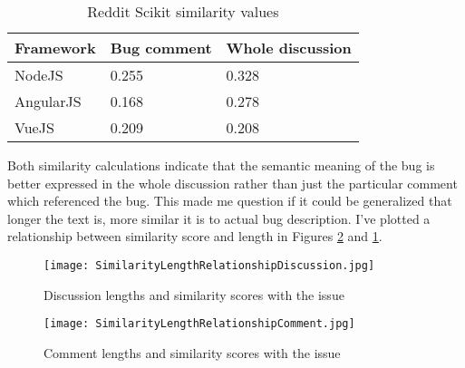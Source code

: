 \begin{table}[H]
\centering
\begin{tabular}{ |p{3cm}||p{3cm}|p{4cm}|}
 \hline
\textbf{ Framework }& \textbf{Bug comment}& \textbf{Whole discussion}\\
 \hline
 NodeJS   & 0.255 & 0.328\\ \hline 
 AngularJS & 0.168 & 0.278 \\ \hline 
 VueJS &  0.209  & 0.208\\ \hline
\end{tabular}
\caption{Reddit Scikit similarity values}
\label{table:RedditSCIKITsimilarity}
\end{table}

Both similarity calculations indicate that the semantic meaning of the bug is better expressed in the whole discussion rather than just the particular comment which referenced the bug. This made me question if it could be generalized that longer the text is, more similar it is to actual bug description. I've plotted a relationship between similarity score and length in Figures \ref{fig:SimilarityLengthRelationshipComment} and \ref{fig:SimilarityLengthRelationshipDiscussion}.

\begin{figure}[H]%
    \centering
	\texttt{[image: SimilarityLengthRelationshipDiscussion.jpg]}
    \caption{Discussion lengths and similarity scores with the issue}%
    \label{fig:SimilarityLengthRelationshipDiscussion}%
\end{figure}

\begin{figure}[H]%
    \centering
	\texttt{[image: SimilarityLengthRelationshipComment.jpg]}
    \caption{Comment lengths and similarity scores with the issue}%
    \label{fig:SimilarityLengthRelationshipComment}%
\end{figure}


